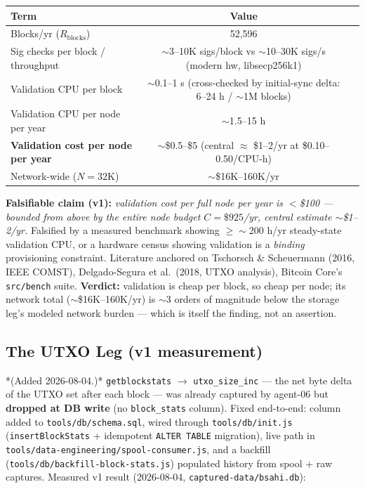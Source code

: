 \documentclass[11pt]{article}
\begin{document}
\begin{center}
\begin{tabular}{lcl}
\toprule
Term & Value & \\
\midrule
Blocks/yr ($R_{\mathrm{blocks}}$) & 52,596 & \\
Sig checks per block / throughput & $\sim$3--10K sigs/block vs $\sim$10--30K sigs/s (modern hw, libsecp256k1) & \\
Validation CPU per block & $\sim$0.1--1 s (cross-checked by initial-sync delta: 6--24 h / $\sim$1M blocks) & \\
Validation CPU per node per year & $\sim$1.5--15 h & \\
\textbf{Validation cost per node per year} & $\sim$\$0.5--\$5 (central $\approx$ \$1--2/yr at \$0.10--0.50/CPU-h) & \\
Network-wide ($N=32$K) & $\sim$\$16K--160K/yr & \\
\bottomrule
\end{tabular}
\end{center}

\textbf{Falsifiable claim (v1):} \emph{validation cost per full node per year is $<$\$100 --- bounded from above by the entire node budget $C=\$925$/yr, central estimate $\sim$\$1--2/yr.} Falsified by a measured benchmark showing $\geq \sim$200 h/yr steady-state validation CPU, or a hardware census showing validation is a \emph{binding} provisioning constraint. Literature anchored on Tschorsch \& Scheuermann (2016, IEEE COMST), Delgado-Segura et al.\ (2018, UTXO analysis), Bitcoin Core's \texttt{src/bench} suite. \textbf{Verdict:} validation is cheap per block, so cheap per node; its network total ($\sim$\$16K--160K/yr) is $\sim$3 orders of magnitude below the storage leg's modeled network burden --- which is itself the finding, not an assertion.

\subsection{The UTXO Leg (v1 measurement)}\label{sec:5.7}
*(Added 2026-08-04.)* \texttt{getblockstats} $\to$ \texttt{utxo\_size\_inc} --- the net byte delta of the UTXO set after each block --- was already captured by agent-06 but \textbf{dropped at DB write} (no \texttt{block\_stats} column). Fixed end-to-end: column added to \texttt{tools/db/schema.sql}, wired through \texttt{tools/db/init.js} (\texttt{insertBlockStats} + idempotent \texttt{ALTER TABLE} migration), live path in \texttt{tools/data-engineering/spool-consumer.js}, and a backfill (\texttt{tools/db/backfill-block-stats.js}) populated history from spool + raw captures. Measured v1 result (2026-08-04, \texttt{captured-data/bsahi.db}):
\end{document}
